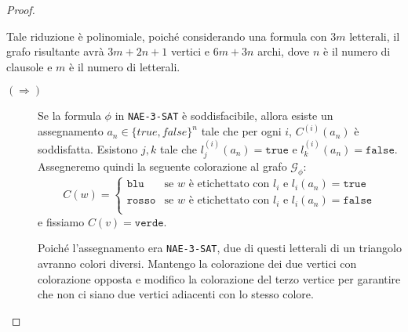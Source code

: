 \begin{proof}
\begin{figure}[H]
    \end{figure}
    Tale riduzione è polinomiale, poiché considerando una formula con $3m$ letterali, il grafo 
    risultante avrà $3m + 2n + 1$ vertici e $6m + 3n$ archi, dove $n$ è il numero di clausole
    e $m$ è il numero di letterali.

    \begin{description}
        \item[$(\Rightarrow)$] Se la formula $\phi$ in \texttt{NAE-3-SAT} è soddisfacibile, allora esiste un assegnamento
        $a_n \in \{ true, false \}^n$ tale che per ogni $i$, $C^{(i)}(a_n)$ è soddisfatta. Esistono 
        $j,k$ tale che $l_j^{(i)}(a_n) = \texttt{true}$ e $l_k^{(i)}(a_n) = \texttt{false}$.
        Assegneremo quindi la seguente colorazione al grafo $\mathcal{G}_\phi$:
        \[
            C(w) = \begin{cases}
                \texttt{blu} & \text{se } w \text{ è etichettato con } l_i \text{ e } l_i(a_n) = \texttt{true} \\
                \texttt{rosso} & \text{se } w \text{ è etichettato con } l_i \text{ e } l_i(a_n) = \texttt{false} \\
            \end{cases}
        \]
        e fissiamo $C(v) = \texttt{verde}$.
    
        Poiché l'assegnamento era \texttt{NAE-3-SAT}, due di questi letterali di un triangolo avranno
        colori diversi. Mantengo 
        la colorazione dei due vertici con colorazione opposta e modifico la colorazione del terzo vertice
        per garantire che non ci siano due vertici adiacenti con lo stesso colore.
    

\end{description}
\end{proof}
